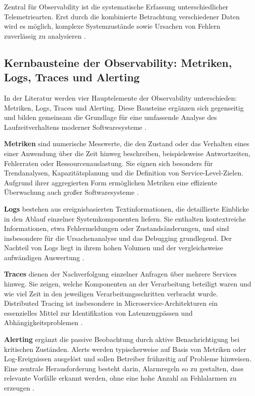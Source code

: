 Zentral für Observability ist die systematische Erfassung unterschiedlicher Telemetriearten. Erst durch die kombinierte Betrachtung verschiedener Daten wird es möglich, komplexe Systemzustände sowie Ursachen von Fehlern zuverlässig zu analysieren \cite{abieba2025advanced,sakinala2025observability}.

\subsection{Kernbausteine der Observability: Metriken, Logs, Traces und Alerting}

In der Literatur werden vier Hauptelemente der Observability unterschieden: Metriken, Logs, Traces und Alerting. Diese Bausteine ergänzen sich gegenseitig und bilden gemeinsam die Grundlage für eine umfassende Analyse des Laufzeitverhaltens moderner Softwaresysteme \cite{abieba2025advanced,sakinala2025observability}.

\textbf{Metriken} sind numerische Messwerte, die den Zustand oder das Verhalten eines einer Anwendung über die Zeit hinweg beschreiben, beispielsweise Antwortzeiten, Fehlerraten oder Ressourcenauslastung. Sie eignen sich besonders für Trendanalysen, Kapazitätsplanung und die Definition von Service-Level-Zielen. Aufgrund ihrer aggregierten Form ermöglichen Metriken eine effiziente Überwachung auch großer Softwaresysteme \cite{sakinala2025observability}.

\textbf{Logs} bestehen aus ereignisbasierten Textinformationen, die detaillierte Einblicke in den Ablauf einzelner Systemkomponenten liefern. Sie enthalten kontextreiche Informationen, etwa Fehlermeldungen oder Zustandsänderungen, und sind insbesondere für die Ursachenanalyse und das Debugging grundlegend. Der Nachteil von Logs liegt in ihrem hohen Volumen und der vergleichsweise aufwändigen Auswertung \cite{abieba2025advanced}.

\textbf{Traces} dienen der Nachverfolgung einzelner Anfragen über mehrere Services hinweg. Sie zeigen, welche Komponenten an der Verarbeitung beteiligt waren und wie viel Zeit in den jeweiligen Verarbeitungsschritten verbracht wurde. Distributed Tracing ist insbesondere in Microservice-Architekturen ein essenzielles Mittel zur Identifikation von Latenzengpässen und Abhängigkeitsproblemen \cite{albuquerque2025tracing}.

\textbf{Alerting} ergänzt die passive Beobachtung durch aktive Benachrichtigung bei kritischen Zuständen. Alerts werden typischerweise auf Basis von Metriken oder Log-Ereignissen ausgelöst und sollen Betreiber frühzeitig auf Probleme hinweisen. Eine zentrale Herausforderung besteht darin, Alarmregeln so zu gestalten, dass relevante Vorfälle erkannt werden, ohne eine hohe Anzahl an Fehlalarmen zu erzeugen \cite{jalalvand2024alert}.

